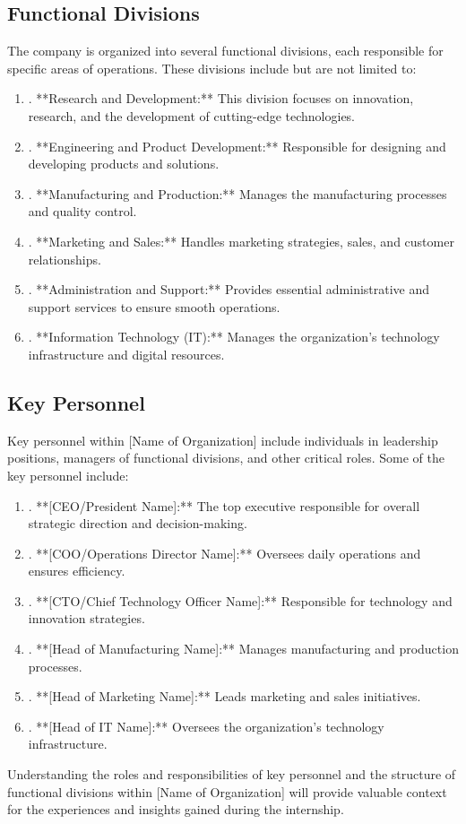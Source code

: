 \subsection{Functional Divisions}

The company is organized into several functional divisions, each responsible for specific areas of operations. These divisions include but are not limited to:
\begin{enumerate}
    \item. **Research and Development:** This division focuses on innovation, research, and the development of cutting-edge technologies.
    \item. **Engineering and Product Development:** Responsible for designing and developing products and solutions.
    \item. **Manufacturing and Production:** Manages the manufacturing processes and quality control.
    \item. **Marketing and Sales:** Handles marketing strategies, sales, and customer relationships.
    \item. **Administration and Support:** Provides essential administrative and support services to ensure smooth operations.
    \item. **Information Technology (IT):** Manages the organization's technology infrastructure and digital resources.
\end{enumerate}

\subsection{Key Personnel}

Key personnel within [Name of Organization] include individuals in leadership positions, managers of functional divisions, and other critical roles. Some of the key personnel include:
\begin{enumerate}
    \item. **[CEO/President Name]:** The top executive responsible for overall strategic direction and decision-making.
    \item. **[COO/Operations Director Name]:** Oversees daily operations and ensures efficiency.
    \item. **[CTO/Chief Technology Officer Name]:** Responsible for technology and innovation strategies.
    \item. **[Head of Manufacturing Name]:** Manages manufacturing and production processes.
    \item. **[Head of Marketing Name]:** Leads marketing and sales initiatives.
    \item. **[Head of IT Name]:** Oversees the organization's technology infrastructure.
\end{enumerate}
Understanding the roles and responsibilities of key personnel and the structure of functional divisions within [Name of Organization] will provide valuable context for the experiences and insights gained during the internship.

